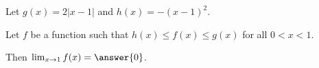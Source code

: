 \documentclass{ximera}
\author{Nela Lakos \and Kyle Parsons}
\begin{document}
\begin{exercise}

Let $g(x) = 2\left|x-1\right|$ and $h(x) = -(x-1)^2$.



Let $f$ be a function such that $h(x) \leq f(x) \leq g(x)$ for all $0 < x < 1$.

Then $\lim_{x\to1}f(x) = \answer{0}$.

\end{exercise}
\end{document}
